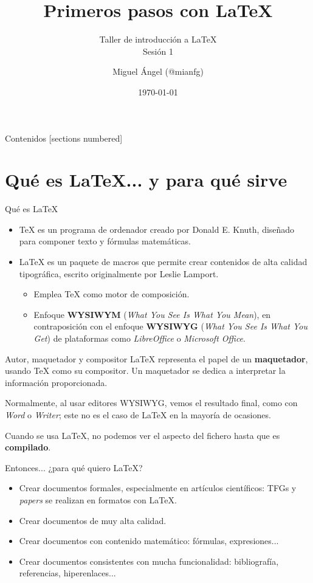 \documentclass[10pt, xcolor=table]{beamer}
\title{Primeros pasos con \LaTeX}
\subtitle{Taller de introducción a \LaTeX{}\\ \alert{Sesión 1}}
\date{\today}
\author{Miguel Ángel (@mianfg)}
\institute{\url{https://github.com/mianfg/latex-intro}}
\begin{document}
\maketitle

\begin{frame}{Contenidos}
	[sections numbered]
	\tableofcontents[hideallsubsections]
\end{frame}

\section{Qué es \LaTeX{}... y para qué sirve}

\begin{frame}{Qué es \LaTeX{}}
	
	\begin{itemize}
		\item \TeX{} es un programa de ordenador creado por Donald E. Knuth, diseñado para componer texto y fórmulas matemáticas.
		\item \LaTeX{} es un paquete de macros que permite crear contenidos de alta calidad tipográfica, escrito originalmente por Leslie Lamport.
		      \begin{itemize}
		      	\item Emplea \TeX{} como motor de composición.
		      	\item Enfoque \textbf{WYSIWYM} (\emph{What You See Is What You Mean}), en contraposición con el enfoque \textbf{WYSIWYG} (\emph{What You See Is What You Get}) de plataformas como \emph{LibreOffice} o \emph{Microsoft Office}.
		      \end{itemize}
	\end{itemize}
	
\end{frame}
\begin{frame}{Autor, maquetador y compositor}
	\LaTeX{} representa el papel de un \textbf{maquetador}, usando \TeX{} como su compositor. Un maquetador se dedica a interpretar la información proporcionada.
	
	Normalmente, al usar editores WYSIWYG, vemos el resultado final, como con \emph{Word} o \emph{Writer}; este no es el caso de \LaTeX{} en la mayoría de ocasiones.
	
	Cuando se usa \LaTeX{}, no podemos ver el aspecto del fichero hasta que es \textbf{compilado}.
\end{frame}

\begin{frame}{Entonces... ¿para qué quiero \LaTeX{}?}
	\begin{itemize}
		\item Crear documentos formales, especialmente en artículos científicos: TFGs y \emph{papers} se realizan en formatos con \LaTeX{}.
		\item Crear documentos de muy alta calidad.
		\item Crear documentos con contenido matemático: fórmulas, expresiones...
		\item Crear documentos consistentes con mucha funcionalidad: bibliografía, referencias, hiperenlaces...
	\end{itemize}
\end{frame}
\end{document}
